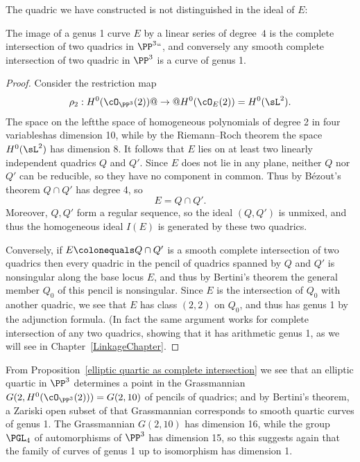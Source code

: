 The quadric we have constructed is not distinguished in the ideal of $E$:

\begin{proposition}\label{elliptic quartic as complete intersection}
 The image of a genus 1 curve $E$ by a
%
linear series of degree~$4$
%
 is the complete intersection of two quadrics in $\PP^3` `$, and conversely any  smooth complete intersection of two quadric
 in $\PP^3$ is a curve of
 genus 1.
\end{proposition}

\begin{proof}
Consider the restriction map
$$
\rho_2  : H^0(\cO_{\PP^3}(2)) @ \to @ H^0(\cO_{E}(2)) = H^0(\sL^2).
$$
The space on the left\emdash the space of homogeneous polynomials of
degree 2 in four variables\emdash has dimension 10, while by the
Riemann--Roch theorem
%
the space $H^0(\sL^2)$ has dimension 8. It follows that $E$ lies on at least two linearly independent quadrics $Q$ and $Q'$. Since $E$ does not lie in any plane, neither $Q$ nor $Q'$ can be reducible, so they have no component in common.
Thus by
B\'ezout's theorem
%
$Q \cap Q' $ has degree 4, so
$$
E =Q \cap Q'.
$$
%
Moreover, $Q,Q'$ form a regular sequence, so the ideal $(Q,Q')$ is unmixed, and thus the homogeneous ideal $I(E)$ is generated by
these two quadrics.

Conversely, if $E \colonequals Q\cap Q'$ is a smooth complete intersection of
two quadrics then  every quadric in the
pencil of quadrics
%
%
spanned by $Q$ and $Q'$ is nonsingular along the base locus $E$, and
thus by
Bertini's theorem
%
the general member $Q_0$ of this
pencil is nonsingular. Since $E$ is the intersection of $Q_0$ with another quadric, we see that $E$ has class $(2,2)$ on $Q_0$,
and thus has genus 1 by the adjunction formula. (In fact the same argument works for complete intersection of any two quadrics,
showing that it has arithmetic genus 1, as we will see in Chapter~\ref{LinkageChapter}.
\end{proof}

From Proposition~\ref{elliptic quartic as complete intersection}
we see that an
elliptic quartic
%
%
in $\PP^3$
determines a point in the Grassmannian
%
$G(2, H^0(\cO_{\PP^3}(2))) =
G(2, 10)$ of pencils of quadrics; and by Bertini's theorem, a Zariski
open subset of that Grassmannian corresponds to smooth quartic curves
of genus 1. The Grassmannian $G(2,10)$ has dimension 16, while the
group $\PGL_4$ of automorphisms of $\PP^3$ has dimension 15, so this
suggests again that the family of curves of genus 1 up to isomorphism
has dimension 1.

